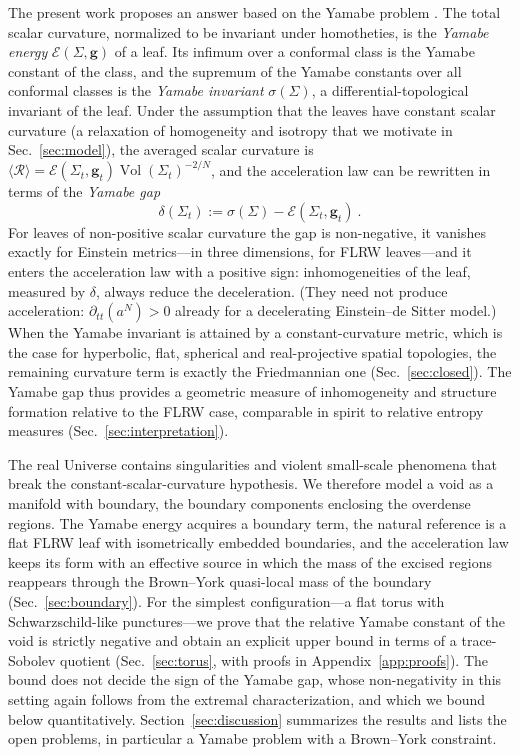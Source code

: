 \documentclass[aps,prd,reprint,amsmath,amssymb,nofootinbib,longbibliography]{revtex4-2}
\DeclareMathOperator{\Vol}{Vol}
\newcommand{\g}{\mathbf{g}}                 %
\newcommand{\Rs}{\mathcal{R}}               %
\newcommand{\EH}{\mathcal{E}}               %
\theoremstyle{plain}
\theoremstyle{definition}
\theoremstyle{remark}
\begin{document}
The present work proposes an answer based on the Yamabe problem \cite{MR125546,MR240748,MR448404,Aubin1976JMPA,MR788292,LeeParker1987}. The total scalar curvature, normalized to be invariant under homotheties, is the \textit{Yamabe energy} $\EH(\Sigma,\g)$ of a leaf. Its infimum over a conformal class is the Yamabe constant of the class, and the supremum of the Yamabe constants over all conformal classes is the \textit{Yamabe invariant} $\sigma(\Sigma)$, a differential-topological invariant of the leaf. Under the assumption that the leaves have constant scalar curvature (a relaxation of homogeneity and isotropy that we motivate in Sec.~\ref{sec:model}), the averaged scalar curvature is $\langle\Rs\rangle = \EH(\Sigma_t,\g_t)\Vol(\Sigma_t)^{-2/N}$, and the acceleration law can be rewritten in terms of the \textit{Yamabe gap}
\begin{equation*}
\delta(\Sigma_t) := \sigma(\Sigma) - \EH(\Sigma_t,\g_t)\ .
\end{equation*}
For leaves of non-positive scalar curvature the gap is non-negative, it vanishes exactly for Einstein metrics---in three dimensions, for FLRW leaves---and it enters the acceleration law with a positive sign: inhomogeneities of the leaf, measured by $\delta$, always reduce the deceleration. (They need not produce acceleration: $\partial_{tt}(a^N)>0$ already for a decelerating Einstein--de Sitter model.) When the Yamabe invariant is attained by a constant-curvature metric, which is the case for hyperbolic, flat, spherical and real-projective spatial topologies, the remaining curvature term is exactly the Friedmannian one (Sec.~\ref{sec:closed}). The Yamabe gap thus provides a geometric measure of inhomogeneity and structure formation relative to the FLRW case, comparable in spirit to relative entropy measures \cite{2004PhRvL92n1302H} (Sec.~\ref{sec:interpretation}).

The real Universe contains singularities and violent small-scale phenomena that break the constant-scalar-curvature hypothesis. We therefore model a void as a manifold with boundary, the boundary components enclosing the overdense regions. The Yamabe energy acquires a boundary term, the natural reference is a flat FLRW leaf with isometrically embedded boundaries, and the acceleration law keeps its form with an effective source in which the mass of the excised regions reappears through the Brown--York quasi-local mass of the boundary (Sec.~\ref{sec:boundary}). For the simplest configuration---a flat torus with Schwarzschild-like punctures---we prove that the relative Yamabe constant of the void is strictly negative and obtain an explicit upper bound in terms of a trace-Sobolev quotient (Sec.~\ref{sec:torus}, with proofs in Appendix~\ref{app:proofs}). The bound does not decide the sign of the Yamabe gap, whose non-negativity in this setting again follows from the extremal characterization, and which we bound below quantitatively. Section~\ref{sec:discussion} summarizes the results and lists the open problems, in particular a Yamabe problem with a Brown--York constraint.
\end{document}
